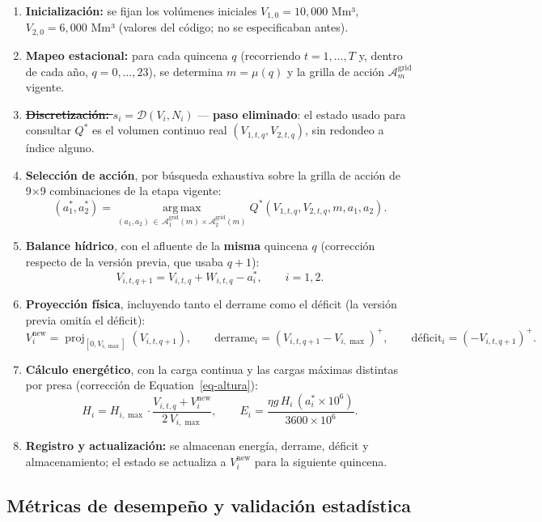 \documentclass[
  letterpaper,
  DIV=11,
  numbers=noendperiod]{scrreprt}
\theoremstyle{definition}
\theoremstyle{remark}
\begin{document}
\begin{enumerate}
\def\labelenumi{\arabic{enumi}.}
\item
  \textbf{Inicialización:} se fijan los volúmenes iniciales
  \(V_{1,0}=10{,}000\) Mm³, \(V_{2,0}=6{,}000\) Mm³ (valores del código;
  no se especificaban antes).
\item
  \textbf{Mapeo estacional:} para cada quincena \(q\) (recorriendo
  \(t=1,\dots,T\) y, dentro de cada año, \(q=0,\dots,23\)), se determina
  \(m=\mu(q)\) y la grilla de acción \(\mathcal A_m^{\text{grid}}\)
  vigente.
\item
  \st{\textbf{Discretización:} $s_i=\mathcal D(V_i,N_i)$} ---
  \textbf{paso eliminado}: el estado usado para consultar \(Q^*\) es el
  volumen continuo real \((V_{1,t,q}, V_{2,t,q})\), sin redondeo a
  índice alguno.
\item
  \textbf{Selección de acción}, por búsqueda exhaustiva sobre la grilla
  de acción de 9×9 combinaciones de la etapa vigente: \[
  (a_1^*,a_2^*) = \operatorname*{arg\,max}_{(a_1,a_2)\,\in\,\mathcal A_1^{\text{grid}}(m)\times\mathcal A_2^{\text{grid}}(m)} Q^{*}(V_{1,t,q},V_{2,t,q},m,a_1,a_2).
  \]
\item
  \textbf{Balance hídrico}, con el afluente de la \textbf{misma}
  quincena \(q\) (corrección respecto de la versión previa, que usaba
  \(q+1\)): \[
  V_{i,t,q+1} = V_{i,t,q} + W_{i,t,q} - a_i^*, \qquad i=1,2.
  \]
\item
  \textbf{Proyección física}, incluyendo tanto el derrame como el
  déficit (la versión previa omitía el déficit): \[
  V_i^{\text{new}} = \operatorname{proj}_{[0,V_{i,\max}]}(V_{i,t,q+1}), \qquad
  \text{derrame}_i = (V_{i,t,q+1}-V_{i,\max})^+, \qquad
  \text{déficit}_i = (-V_{i,t,q+1})^+.
  \]
\item
  \textbf{Cálculo energético}, con la carga continua y las cargas
  máximas distintas por presa (corrección de Equation~\ref{eq-altura}):
  \[
  H_i = H_{i,\max}\cdot\frac{V_{i,t,q}+V_i^{\text{new}}}{2\,V_{i,\max}}, \qquad
  E_i = \frac{\eta g\, H_i\,(a_i^*\times10^6)}{3600\times10^6}.
  \]
\item
  \textbf{Registro y actualización:} se almacenan energía, derrame,
  déficit y almacenamiento; el estado se actualiza a
  \(V_i^{\text{new}}\) para la siguiente quincena.
\end{enumerate}

\subsection{Métricas de desempeño y validación
estadística}\label{sec-metricas}
\end{document}
